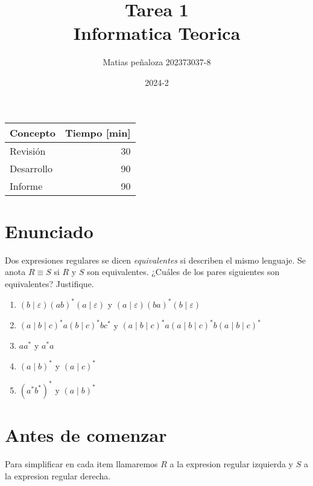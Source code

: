 \documentclass[spanish, draft]{article}
\begin{document}
\title{
    Tarea 1 \\
    Informatica Teorica
}
\author{
    Matias peñaloza
    202373037-8
}
\date{
    2024-2
}
\maketitle

\begin{center}
    \begin{tabular}{|l|r|}
      \hline
      \multicolumn{1}{|c|}{\textbf{Concepto}} &
        \multicolumn{1}{c|}{\textbf{Tiempo [min]}} \\
      \hline
      Revisión & 30\\
      \hline
      Desarrollo    & 90\\
      \hline
      Informe	      & 90\\
      \hline
    \end{tabular}
  \end{center}

\section*{Enunciado}
  Dos expresiones regulares se dicen \emph{equivalentes}
  si describen el mismo lenguaje.
  Se anota \(R \equiv S\) si \(R\) y \(S\) son equivalentes.
  ¿Cuáles de los pares siguientes son equivalentes?
  Justifique.
  \begin{enumerate}
  \item %
    \((b \mid \varepsilon) (a b)^* (a \mid \varepsilon)\)
    y \((a \mid \varepsilon) (b a)^* (b \mid \varepsilon)\)
  \item %
    \((a \mid b \mid c)^* a (b \mid c)^* b c^*\)
    y \((a \mid b \mid c)^* a (a \mid b \mid c)^* b (a \mid b \mid c)^*\)
  \item %
    \(a a^*\)
    y \(a^* a\)
  \item %
    \((a \mid b)^*\)
    y \((a \mid c)^*\)
  \item %
    \((a^* b^*)^*\)
    y \((a \mid b)^*\)
  \end{enumerate}

\section*{Antes de comenzar}
	Para simplificar en cada item llamaremos $R$ a la expresion regular izquierda y $S$ a la expresion regular derecha.
\end{document}
